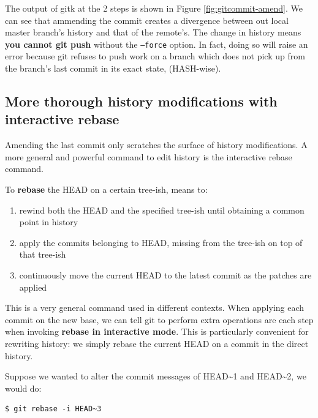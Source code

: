 \documentclass{../../common/tufte-latex/tufte-handout}
\begin{document}
The output of gitk at the 2 steps is shown in Figure \ref{fig:gitcommit-amend}.
We can see that ammending the commit creates a divergence between out local master branch's history and that of the remote's.
The change in history means \textbf{you cannot git push} without the \texttt{--force} option. 
In fact, doing so will raise an error because git refuses to push work on a branch which does not pick up from the branch's last commit in its exact state, (HASH-wise).

\subsection{More thorough history modifications with interactive rebase}
Amending the last commit only scratches the surface of history modifications.
A more general and powerful command to edit history is the interactive rebase command.

To \textbf{rebase} the HEAD on a certain tree-ish, means to:

\begin{enumerate} 
 \item{rewind both the HEAD and the specified tree-ish until obtaining a common point in history}
 \item{apply the commits belonging to HEAD, missing from the tree-ish on top of that tree-ish}
 \item{continuously move the current HEAD to the latest commit as the patches are applied}
\end{enumerate}

This is a very general command used in different contexts.
When applying each commit on the new base, we can tell git to perform extra operations are each step when invoking \textbf{rebase in interactive mode}.
This is particularly convenient for rewriting history: we simply rebase the current HEAD on a commit in the direct history.

Suppose we wanted to alter the commit messages of HEAD\textasciitilde1 and HEAD\textasciitilde2, we would do:
\begin{lstlisting}[style=BashInputStyle]
  $ git rebase -i HEAD~3
\end{lstlisting}
\end{document}
